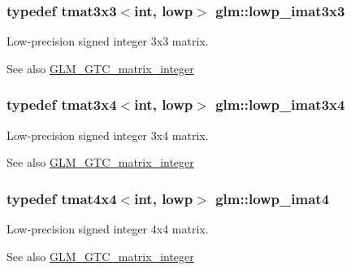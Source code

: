 \subsubsection[{lowp\+\_\+imat3x3}]{\setlength{\rightskip}{0pt plus 5cm}typedef tmat3x3$<$int, lowp$>$ {\bf glm\+::lowp\+\_\+imat3x3}}\label{group__gtc__matrix__integer_ga434abdeee9a8908660691be659f6693f}
Low-\/precision signed integer 3x3 matrix. \begin{DoxySeeAlso}{See also}
\hyperlink{group__gtc__matrix__integer}{G\+L\+M\+\_\+\+G\+T\+C\+\_\+matrix\+\_\+integer} 
\end{DoxySeeAlso}
\hypertarget{group__gtc__matrix__integer_ga61fe3487c1f4f10fb0f5c9fa0873a694}{}
\subsubsection[{lowp\+\_\+imat3x4}]{\setlength{\rightskip}{0pt plus 5cm}typedef tmat3x4$<$int, lowp$>$ {\bf glm\+::lowp\+\_\+imat3x4}}\label{group__gtc__matrix__integer_ga61fe3487c1f4f10fb0f5c9fa0873a694}
Low-\/precision signed integer 3x4 matrix. \begin{DoxySeeAlso}{See also}
\hyperlink{group__gtc__matrix__integer}{G\+L\+M\+\_\+\+G\+T\+C\+\_\+matrix\+\_\+integer} 
\end{DoxySeeAlso}
\hypertarget{group__gtc__matrix__integer_gad9a60f2ee78750d31b129c01096751b6}{}
\subsubsection[{lowp\+\_\+imat4}]{\setlength{\rightskip}{0pt plus 5cm}typedef tmat4x4$<$int, lowp$>$ {\bf glm\+::lowp\+\_\+imat4}}\label{group__gtc__matrix__integer_gad9a60f2ee78750d31b129c01096751b6}
Low-\/precision signed integer 4x4 matrix. \begin{DoxySeeAlso}{See also}
\hyperlink{group__gtc__matrix__integer}{G\+L\+M\+\_\+\+G\+T\+C\+\_\+matrix\+\_\+integer} 
\end{DoxySeeAlso}
\hypertarget{group__gtc__matrix__integer_ga87e2118b22cbc6916805aafcda52a943}{}
